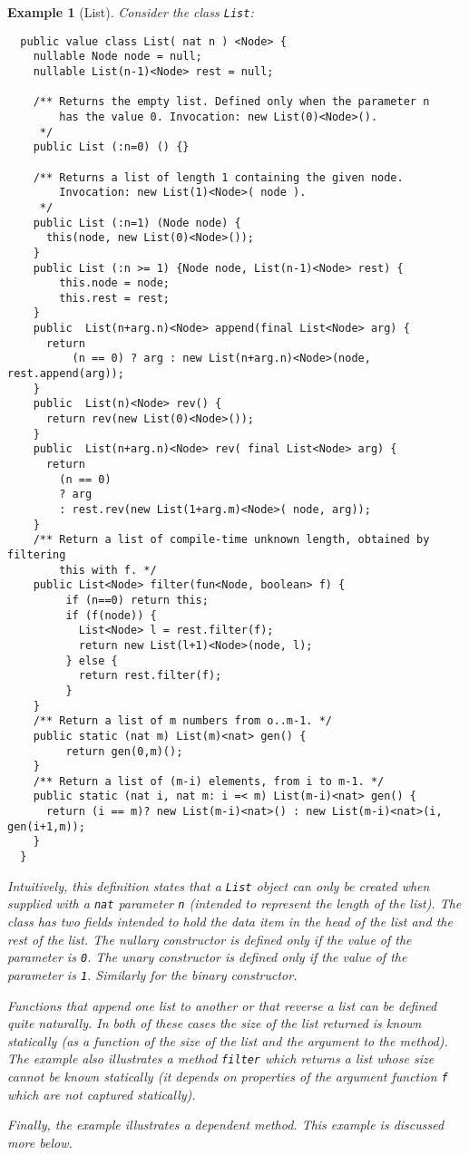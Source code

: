 \documentclass{article}
\newtheorem{example}{Example}[section]
\begin{document}
\begin{example}[List]\label{List}
Consider the class {\tt List}:
{\footnotesize
\begin{verbatim}
  public value class List( nat n ) <Node> {
    nullable Node node = null;
    nullable List(n-1)<Node> rest = null;

    /** Returns the empty list. Defined only when the parameter n 
        has the value 0. Invocation: new List(0)<Node>().
     */
    public List (:n=0) () {}

    /** Returns a list of length 1 containing the given node.
        Invocation: new List(1)<Node>( node ).
     */
    public List (:n=1) (Node node) {
      this(node, new List(0)<Node>());
    }
    public List (:n >= 1) {Node node, List(n-1)<Node> rest) {
        this.node = node;
        this.rest = rest;
    }
    public  List(n+arg.n)<Node> append(final List<Node> arg) {
      return 
          (n == 0) ? arg : new List(n+arg.n)<Node>(node, rest.append(arg));
    }
    public  List(n)<Node> rev() {
      return rev(new List(0)<Node>());
    }
    public  List(n+arg.n)<Node> rev( final List<Node> arg) {
      return 
        (n == 0) 
        ? arg 
        : rest.rev(new List(1+arg.m)<Node>( node, arg));
    }
    /** Return a list of compile-time unknown length, obtained by filtering
        this with f. */
    public List<Node> filter(fun<Node, boolean> f) {
         if (n==0) return this;
         if (f(node)) {
           List<Node> l = rest.filter(f);
           return new List(l+1)<Node>(node, l);
         } else {
           return rest.filter(f);
         }
    }
    /** Return a list of m numbers from o..m-1. */
    public static (nat m) List(m)<nat> gen() {
         return gen(0,m)();
    }
    /** Return a list of (m-i) elements, from i to m-1. */
    public static (nat i, nat m: i =< m) List(m-i)<nat> gen() {
      return (i == m)? new List(m-i)<nat>() : new List(m-i)<nat>(i, gen(i+1,m));
    }
  }  
\end{verbatim}}

Intuitively, this definition states that a {\tt List} object can only
be created when supplied with a {\tt nat} parameter {\tt n} (intended
to represent the length of the list). The class has two fields
intended to hold the data item in the head of the list and the rest of
the list. The nullary constructor is defined only if the value of the
parameter is {\tt 0}.  The unary constructor is defined only if the
value of the parameter is {\tt 1}. Similarly for the binary
constructor.

Functions that append one list to another or that reverse a list can
be defined quite naturally. In both of these cases the size of the
list returned is known statically (as a function of the size of the
list and the argument to the method).  The example also illustrates a
method {\tt filter} which returns a list whose size cannot be known
statically (it depends on properties of the argument function {\tt f}
which are not captured statically).

Finally, the example illustrates a dependent method. This example is
discussed more below.
\end{example}
\end{document}

